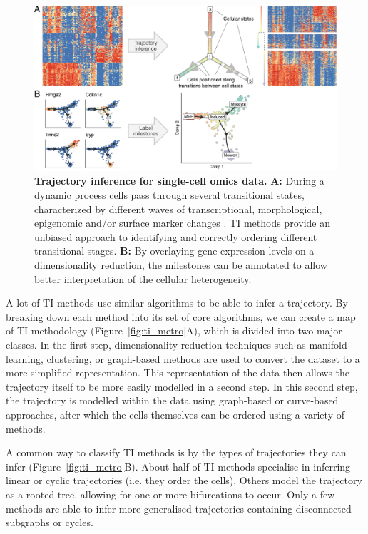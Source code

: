 \begin{figure}[htb!]
	\centering
	\includegraphics[width=.9\linewidth]{fig/comptools2/comptool_3_trajectoryinference.pdf} 
	\caption{
		\textbf{Trajectory inference for single-cell omics data.}
		\textbf{A:} During a dynamic process cells pass through several transitional states, characterized by different waves of transcriptional, morphological, epigenomic and/or surface marker changes \cite{enver_stemcellstates_2009}. TI methods provide an unbiased approach to identifying and correctly ordering different transitional stages. 
		\textbf{B:} By overlaying gene expression levels on a dimensionality reduction, the milestones can be annotated to allow better interpretation of the cellular heterogeneity.
	}
	\label{fig:comp_tools_ti}
\end{figure}

A lot of TI methods use similar algorithms to be able to infer a trajectory. By breaking down each method into its set of core algorithms, we can create a map of TI methodology \cite{cannoodt_computationalmethodstrajectory_2016} (Figure~\ref{fig:ti_metro}A), which is divided into two major classes.
In the first step, dimensionality reduction techniques such as manifold learning, clustering, or graph-based methods are used to convert the dataset to a more simplified representation. This representation of the data then allows the trajectory itself to be more easily modelled in a second step. In this second step, the trajectory is modelled within the data using graph-based or curve-based approaches, after which the cells themselves can be ordered using a variety of methods.

A common way to classify TI methods is by the types of trajectories they can infer \cite{saelens_comparisonsinglecelltrajectory_2019} (Figure~\ref{fig:ti_metro}B). About half of TI methods specialise in inferring linear or cyclic trajectories (i.e. they order the cells). Others model the trajectory as a rooted tree, allowing for one or more bifurcations to occur. Only a few methods are able to infer more generalised trajectories containing disconnected subgraphs or cycles.

